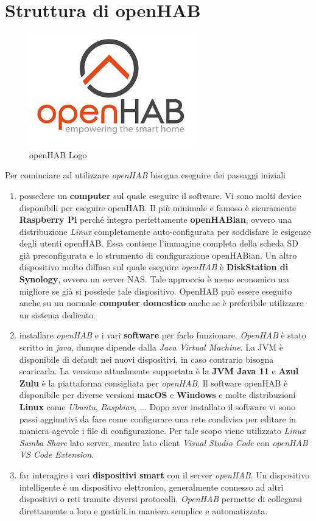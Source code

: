 \chapter{Struttura di openHAB}
\begin{figure}
    \centering
    \includegraphics{Immagini/openhab_logo.png}
    \caption{openHAB Logo}
    \label{fig:openhab_logo}
\end{figure}

Per cominciare ad utilizzare {\em openHAB } bisogna eseguire dei passaggi iniziali
\begin{enumerate}
    \item possedere un \textbf{computer} sul quale eseguire il software. Vi sono molti device disponibili per eseguire openHAB. Il più minimale e famoso è sicuramente \textbf{Raspberry Pi} perché integra perfettamente \textbf{openHABian}, ovvero una distribuzione {\em Linux} completamente auto-configurata per soddisfare le esigenze degli utenti openHAB. Essa contiene l'immagine completa della scheda SD già preconfigurata e lo strumento di configurazione openHABian. Un altro dispositivo molto diffuso sul quale eseguire {\em openHAB} è \textbf{DiskStation di Synology}, ovvero un server NAS. Tale approccio è meno economico ma migliore se già si possiede tale dispositivo. OpenHAB può essere eseguito anche su un normale \textbf{computer domestico} anche se è preferibile utilizzare un sistema dedicato.
    \item installare {\em openHAB} e i vari \textbf{software} per farlo funzionare. {\em OpenHAB} è stato scritto in {\em java}, dunque dipende dalla {\em Java Virtual Machine}. La JVM è disponibile di default nei nuovi dispositivi, in caso contrario bisogna scaricarla. La versione attualmente supportata è la \textbf{JVM Java 11} e \textbf{Azul Zulu} è la piattaforma consigliata per {\em openHAB}. Il software openHAB è disponibile per diverse versioni \textbf{macOS} e \textbf{Windows} e molte distribuzioni \textbf{Linux} come {\em Ubuntu}, {\em Raspbian}, ... Dopo aver installato il software vi sono passi aggiuntivi da fare come configurare una rete condivisa per editare in maniera agevole i file di configurazione. Per tale scopo viene utilizzato {\em Linux Samba Share} lato server, mentre lato client {\em Visual Studio Code} con {\em openHAB VS Code Extension}.
    \item far interagire i vari \textbf{dispositivi smart} con il server {\em openHAB}. Un dispositivo intelligente è un dispositivo elettronico, generalmente connesso ad altri dispositivi o reti tramite diversi protocolli. {\em OpenHAB} permette di collegarsi direttamente a loro e gestirli in maniera semplice e automatizzata.
\end{enumerate}

